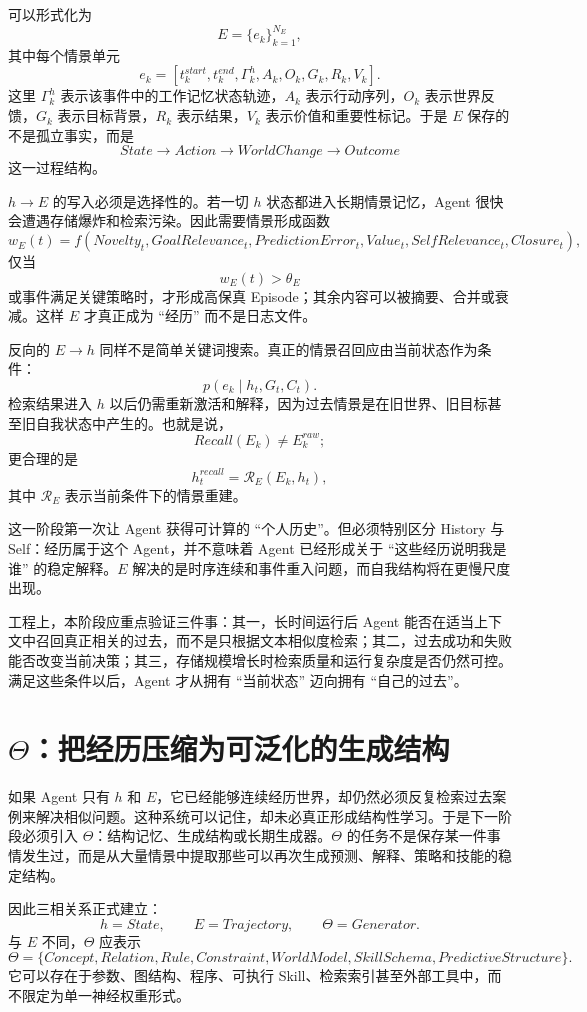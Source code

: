 可以形式化为
\[
E
=
\{
e_k
\}_{k=1}^{N_E},
\]
其中每个情景单元
\[
e_k
=
\left[
t_k^{start},
t_k^{end},
\Gamma_k^{h},
A_k,
O_k,
G_k,
R_k,
V_k
\right].
\]
这里 $\Gamma_k^{h}$ 表示该事件中的工作记忆状态轨迹，$A_k$ 表示行动序列，$O_k$ 表示世界反馈，$G_k$ 表示目标背景，$R_k$ 表示结果，$V_k$ 表示价值和重要性标记。于是 $E$ 保存的不是孤立事实，而是
\[
State
\rightarrow
Action
\rightarrow
WorldChange
\rightarrow
Outcome
\]
这一过程结构。

$h\rightarrow E$ 的写入必须是选择性的。若一切 $h$ 状态都进入长期情景记忆，Agent 很快会遭遇存储爆炸和检索污染。因此需要情景形成函数
\[
w_E(t)
=
f(
Novelty_t,
GoalRelevance_t,
PredictionError_t,
Value_t,
SelfRelevance_t,
Closure_t
),
\]
仅当
\[
w_E(t)>\theta_E
\]
或事件满足关键策略时，才形成高保真 Episode；其余内容可以被摘要、合并或衰减。这样 $E$ 才真正成为 ``经历'' 而不是日志文件。

反向的 $E\rightarrow h$ 同样不是简单关键词搜索。真正的情景召回应由当前状态作为条件：
\[
p(e_k\mid h_t,G_t,C_t).
\]
检索结果进入 $h$ 以后仍需重新激活和解释，因为过去情景是在旧世界、旧目标甚至旧自我状态中产生的。也就是说，
\[
Recall(E_k)\neq E_k^{raw};
\]
更合理的是
\[
h_t^{recall}
=
\mathcal R_E(E_k,h_t),
\]
其中 $\mathcal R_E$ 表示当前条件下的情景重建。

这一阶段第一次让 Agent 获得可计算的 ``个人历史''。但必须特别区分 History 与 Self：经历属于这个 Agent，并不意味着 Agent 已经形成关于 ``这些经历说明我是谁'' 的稳定解释。$E$ 解决的是时序连续和事件重入问题，而自我结构将在更慢尺度出现。

工程上，本阶段应重点验证三件事：其一，长时间运行后 Agent 能否在适当上下文中召回真正相关的过去，而不是只根据文本相似度检索；其二，过去成功和失败能否改变当前决策；其三，存储规模增长时检索质量和运行复杂度是否仍然可控。满足这些条件以后，Agent 才从拥有 ``当前状态'' 迈向拥有 ``自己的过去''。

\section{$\Theta$：把经历压缩为可泛化的生成结构}

如果 Agent 只有 $h$ 和 $E$，它已经能够连续经历世界，却仍然必须反复检索过去案例来解决相似问题。这种系统可以记住，却未必真正形成结构性学习。于是下一阶段必须引入 $\Theta$：结构记忆、生成结构或长期生成器。$\Theta$ 的任务不是保存某一件事情发生过，而是从大量情景中提取那些可以再次生成预测、解释、策略和技能的稳定结构。

因此三相关系正式建立：
\[
\boxed{
h=State,\qquad
E=Trajectory,\qquad
\Theta=Generator.
}
\]
与 $E$ 不同，$\Theta$ 应表示
\[
\Theta
=
\{
Concept,
Relation,
Rule,
Constraint,
WorldModel,
SkillSchema,
PredictiveStructure
\}.
\]
它可以存在于参数、图结构、程序、可执行 Skill、检索索引甚至外部工具中，而不限定为单一神经权重形式。

